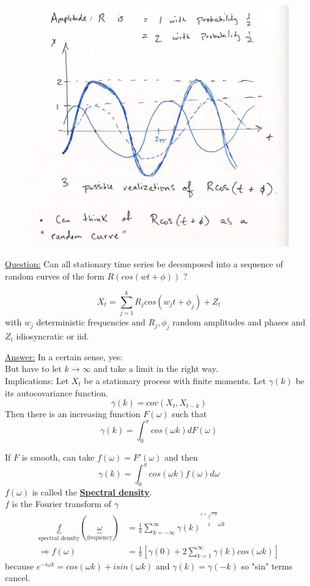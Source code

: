 \begin{figure}[h]
\includegraphics[scale=0.25]{images/Screenshot 2024-04-29 at 08.38.59.jpg}
\centering
\end{figure}



\underline{Question:} Can all stationary time series be decomposed into a sequence of random curves of the form $R(cos(wt + \phi))$ ? 

\[X_t = \sum_{j=1}^k R_j cos(w_j t +\phi_j)+Z_t \]
\quad with $w_j$ deterministic frequencies and $R_j, \phi_j$ random amplitudes and phases and $Z_t$ idiosyncratic or iid. 

\underline{Answer:} In a certain sense, yes: \\
\quad But have to let $k\rightarrow \infty$ and take a limit in the right way. \\

Implications: \quad Let $X_t$ be a stationary process with finite moments. Let $\gamma(k)$ be its autocovariance function. \[
\gamma(k) = cov(X_t, X_{t-k})
\]
Then there is an increasing function $F(\omega)$ such that \[
\gamma(k) = \int_0^\pi cos(\omega k)d F(\omega)
\]

If $F$ is smooth, can take $f(\omega) = F'(\omega)$ and then \[
\gamma(k)=\int_0^\pi cos(\omega k) f(\omega) d\omega
\]
$f(\omega)$ is called the \textbf{\underline{Spectral density}}.\\
$f$ is the Fourier transform of $\gamma$ 
\begin{align*}
\underbrace{f}_\text{spectral density}(\underbrace{\omega}_\text{frequency}) &= \frac{1}{\pi} \sum_{k=-\infty}^{\infty} \gamma(k)^{\overbrace{i}^\text{$i=\sqrt{-1}$}\omega k}\\
\Rightarrow f(\omega)&= \frac{1}{\pi}[\gamma(0)+2\sum_{k=1}^{\infty} \gamma(k) cos(\omega k) ]
\end{align*}
because $e^{-i\omega k}=cos(\omega k) + i sin(\omega k)$ and $\gamma(k) = \gamma(-k)$ so "sin" terms cancel. \\

